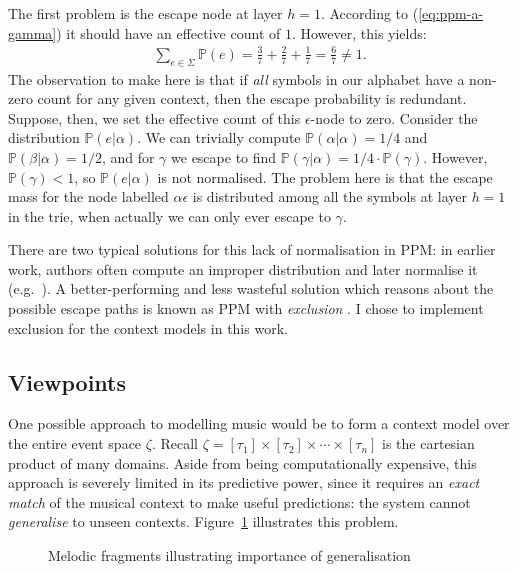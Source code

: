 \documentclass[12pt,a4paper,twoside,openright]{report}
\begin{document}
The first problem is the escape node at layer $h = 1$. According to
(\ref{eq:ppm-a-gamma}) it should have an effective count of $1$. However, this
yields:
\begin{align}
  \sum_{e \in \Sigma} \mathbb{P}(e) = \frac{3}{7} + \frac{2}{7} + \frac{1}{7} =
\frac{6}{7} \neq 1. 
\end{align} 
The observation to make here is that if \emph{all} symbols in our alphabet have
a non-zero count for any given context, then the escape probability is
redundant. Suppose, then, we set the effective count of this $\epsilon$-node to
zero. Consider the distribution $\mathbb{P}(e|\alpha)$. We can trivially compute
$\mathbb{P}(\alpha|\alpha) = 1/4$ and $\mathbb{P}(\beta|\alpha) = 1/2$, and for
$\gamma$ we escape to find $\mathbb{P}(\gamma|\alpha) = 1/4 \cdot
\mathbb{P}(\gamma)$. However, $\mathbb{P}(\gamma) < 1$, so
$\mathbb{P}(e|\alpha)$ is not normalised. The problem here is that the escape
mass for the node labelled $\alpha\epsilon$ is distributed among all the symbols
at layer $h = 1$ in the trie, when actually we can only ever escape to $\gamma$.

There are two typical solutions for this lack of normalisation in PPM: in
earlier work, authors often compute an improper distribution and later normalise
it (e.g.\ \cite{conklin1990prediction}). A better-performing and less wasteful
solution which reasons about the possible escape paths is known as PPM with
\emph{exclusion} \cite{pearce2004improved}. I chose to implement exclusion for
the context models in this work.

\subsection{Viewpoints}\label{sec:mvs-formalism}

One possible approach to modelling music would be to form a context model over
the entire event space $\zeta$.  Recall $\zeta = [\tau_1] \times [\tau_2] \times
\cdots \times [\tau_n]$ is the cartesian product of many domains. Aside from
being computationally expensive, this approach is severely limited in its
predictive power, since it requires an \emph{exact match} of the musical context
to make useful predictions: the system cannot \emph{generalise} to unseen
contexts.  Figure~\ref{fig:generalise} illustrates this problem.

\begin{figure}[H]
\centering

\caption{Melodic fragments illustrating importance of generalisation}
\label{fig:generalise}
\end{figure}
\end{document}
